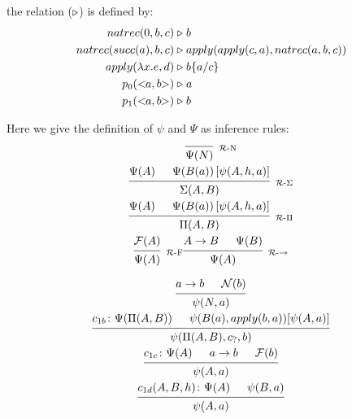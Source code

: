 	\begin{dede}
		the  relation ($\mathrel{\triangleright}$)
		is defined by:
		\begin{equation}
		\begin{split}
		natrec(0, b, c) & \ctr  b \\
		natrec(succ(a), b, c) & \ctr  apply(apply(c,  a), natrec(a, b, c)) \\
		apply(\lambda x.e, d) & \ctr  \sbs{b}{a}{c}\\
		p_0(\cp[a,b]) & \ctr a\\
		p_1(\cp[a,b]) & \ctr b		
		\end{split}
		\end{equation}	
	\end{dede}
	
	\begin{dede}
	Here we give the definition of $\psi$ and $\Psi$ as inference rules:
	\begin{gather*}
	\begin{prooftree}
	\Infer{0}[${}_\RN$]{\Psi(N)}
	\end{prooftree}	\label{def:RN}\\
	\begin{prooftree}
	\Hypo{\Psi(A)}
	\Hypo{\Psi(B(a)) \left[\psi(A,h,a)\right]}
	\Infer2[${}_\RS$]{\Sigma(A,B)}		
	\end{prooftree}\\
	\begin{prooftree}
	\Hypo{\Psi(A)}
	\Hypo{\Psi(B(a)) \left[\psi(A,h,a)\right]}
	\Infer2[${}_\RP$]{\Pi(A,B)}		
	\end{prooftree}\\
	\begin{prooftree}
	\Hypo{\mathcal{F}(A)}
	\Infer1[${}_\RF$]{\Psi(A)}
	\end{prooftree}
	\begin{prooftree}
	\Hypo{A\rightarrow B}
	\Hypo{\Psi(B)}
	\Infer2[${}_\RAr$]{\Psi(A)}
	\end{prooftree}
	\end{gather*}
	
	
	\begin{gather}
	\begin{prooftree}
	\Hypo{a \rightarrow b}
	\Hypo{\mathcal{N}(b) }
	\Infer2{\psi(N,a)}
	\end{prooftree}	
	\\
	\begin{prooftree}
		\Hypo{c_{1b} \colon \Psi(\Pi(A,B))}
		\Hypo{\psi(B(a), apply(b, a))[\psi(A,a)]}
		\Infer{2}{\psi(\Pi(A,B),c_?,b)}
	\end{prooftree}\\		
	\begin{prooftree}
	\Hypo{c_{1c} \colon \Psi(A)}
	\Hypo{a \rightarrow b}
	\Hypo{\mathcal{F}(b)}
	\Infer3{\psi(A,a)}
	\end{prooftree}	\\		
	\begin{prooftree}
	\Hypo{c_{1d}(A,B,h) \colon \Psi(A)}
	\Hypo{\psi(B,a)}
	\Infer2{\psi(A,a)}
	\end{prooftree}	
	\end{gather}
	

\end{dede}
